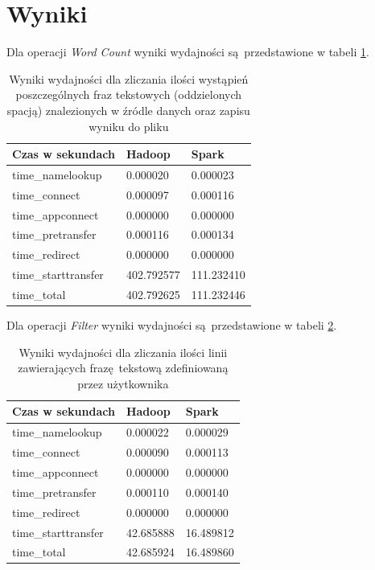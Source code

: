 \section{Wyniki}
Dla operacji \textit{Word Count} wyniki wydajności są przedstawione w tabeli \ref{tab:word-count-results}. 
\begin{table}[]
	\centering
	\caption{Wyniki wydajności dla zliczania ilości wystąpień poszczególnych fraz tekstowych (oddzielonych spacją) znalezionych w źródle danych oraz zapisu wyniku do pliku}
	\label{tab:word-count-results}
	\begin{tabular}{|l|l|l|}
		\hline
		Czas w sekundach    & Hadoop     & Spark      \\ \hline
		time\_namelookup    & 0.000020   & 0.000023   \\ \hline
		time\_connect       & 0.000097   & 0.000116   \\ \hline
		time\_appconnect    & 0.000000   & 0.000000   \\ \hline
		time\_pretransfer   & 0.000116   & 0.000134   \\ \hline
		time\_redirect      & 0.000000   & 0.000000   \\ \hline
		time\_starttransfer & 402.792577 & 111.232410 \\ \hline
		time\_total         & 402.792625 & 111.232446 \\ \hline
	\end{tabular}
\end{table}
Dla operacji \textit{Filter} wyniki wydajności są przedstawione w tabeli \ref{tab:filter-results}.
\begin{table}[]
	\centering
	\caption{Wyniki wydajności dla zliczania ilości linii zawierających frazę tekstową zdefiniowaną przez użytkownika}
	\label{tab:filter-results}
	\begin{tabular}{|l|l|l|}
		\hline
		Czas w sekundach    & Hadoop    & Spark     \\ \hline
		time\_namelookup    & 0.000022  & 0.000029  \\ \hline
		time\_connect       & 0.000090  & 0.000113  \\ \hline
		time\_appconnect    & 0.000000  & 0.000000  \\ \hline
		time\_pretransfer   & 0.000110  & 0.000140  \\ \hline
		time\_redirect      & 0.000000  & 0.000000  \\ \hline
		time\_starttransfer & 42.685888 & 16.489812 \\ \hline
		time\_total         & 42.685924 & 16.489860 \\ \hline
	\end{tabular}
\end{table}
